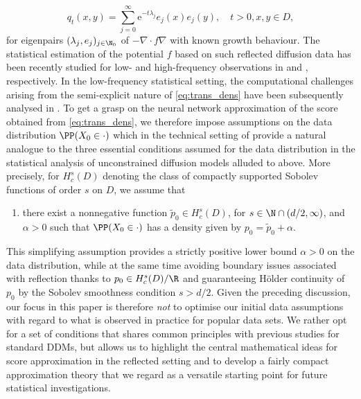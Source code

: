 \documentclass[a4paper, 11pt, headings = small, abstract]{scrartcl}
\begin{document}
\begin{equation}\label{eq:trans_dens}
q_t(x,y) = \sum_{j=0}^\infty \mathrm{e}^{-t\lambda_j} e_j(x)e_j(y), \quad t > 0, x,y \in D,
\end{equation}
for eigenpairs $(\lambda_j,e_j)_{j \in \N_0}$ of $-\nabla \cdot f\nabla$ with known growth behaviour. 
The statistical estimation of the potential $f$ based on such reflected diffusion data has been recently studied for low- and high-frequency observations in \cite{nickl23} and \cite{hoffmann22}, respectively. In the low-frequency statistical setting, the computational challenges arising  from the semi-explicit nature of \eqref{eq:trans_dens} have been subsequently analysed in \cite{giordano24}. To get a grasp on the neural network approximation of the score obtained from \eqref{eq:trans_dens}, we therefore impose assumptions on the data distribution $\PP(X_0 \in \cdot)$ which in the technical setting of \cite{nickl23} provide a natural analogue to the three essential conditions assumed for the data distribution in the statistical analysis of unconstrained diffusion models alluded to above. More precisely, for $H^s_c(D)$ denoting the class of compactly supported Sobolev functions of order $s$ on $D$, we assume that 
\begin{enumerate}[label = ($\mathcal{H}$0), ref = ($\mathcal{H}$0)]
\item \label{ass:init} there exist a nonnegative function $\tilde{p}_0 \in H^s_c(D)$, for $s \in \N \cap (d/2,\infty)$, and $\alpha > 0$ such that $\PP(X_0 \in \cdot)$ has a density given by $p_0 = \tilde{p}_0 + \alpha$.
\end{enumerate}
This simplifying assumption provides a strictly positive lower bound $\alpha > 0$ on the data distribution, while at the same time avoiding boundary issues associated with reflection thanks to $p_0 \in H^s_c(D)/\R$ and guaranteeing Hölder continuity of $p_0$ by the Sobolev smoothness condition $s > d/2$. Given the preceding discussion, our focus in this paper is therefore \emph{not} to optimise our initial data assumptions with regard to what is observed in practice for popular data sets. We rather opt for a set of conditions that shares common principles with previous studies for standard DDMs, but allows us to highlight the central mathematical ideas for score approximation in the reflected setting and to develop a fairly compact approximation theory that we regard as a versatile starting point for future statistical investigations.
\end{document}
